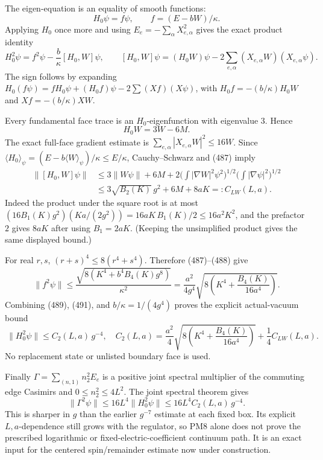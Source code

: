 \documentclass[
  11pt,
]{article}
\begin{document}
The eigen-equation is an equality of smooth functions: \[
 H_0\psi=f\psi,\qquad f=(E-bW)/\kappa. \tag{488}
\] Applying \(H_0\) once more and using
\(E_e=-\sum_\alpha X_{e,\alpha}^2\) gives the exact product identity \[
 H_0^2\psi=f^2\psi-\frac b\kappa[H_0,W]\psi,\qquad
 [H_0,W]\psi=(H_0W)\psi-2\sum_{e,\alpha}(X_{e,\alpha}W)(X_{e,\alpha}\psi).
 \tag{489}
\] The sign follows by expanding
\(H_0(f\psi)=fH_0\psi+(H_0f)\psi-2\sum(Xf)(X\psi)\), with
\(H_0f=-(b/\kappa)H_0W\) and \(Xf=-(b/\kappa)XW\).

Every fundamental face trace is an \(H_0\)-eigenfunction with eigenvalue
\(3\). Hence \[
 H_0W=3W-6M. \tag{490}
\] The exact full-face gradient estimate is
\(\sum_{e,\alpha}|X_{e,\alpha}W|^2\le16W\). Since
\(\langle H_0\rangle_\psi=(E-b\langle W\rangle_\psi)/\kappa\le E/\kappa\),
Cauchy--Schwarz and (487) imply \[
\begin{aligned}
\|[H_0,W]\psi\|
&\le3\|W\psi\|+6M
 +2\Big(\int|\nabla W|^2\psi^2\Big)^{1/2}
       \Big(\int|\nabla\psi|^2\Big)^{1/2}\\
&\le3\sqrt{B_2(K)}\,g^2+6M+8aK=:C_{LW}(L,a).
\end{aligned}\tag{491}
\] Indeed the product under the square root is at most
\((16B_1(K)g^2)(Ka/(2g^2))=16aK\,B_1(K)/2\le16a^2K^2\), and the
prefactor \(2\) gives \(8aK\) after using \(B_1=2aK\). (Keeping the
unsimplified product gives the same displayed bound.)

For real \(r,s\), \((r+s)^4\le8(r^4+s^4)\). Therefore (487)--(488) give
\[
\|f^2\psi\|
\le\frac{\sqrt{8(K^4+b^4B_4(K)g^8)}}{\kappa^2}
=\frac{a^2}{4g^4}
\sqrt{8\left(K^4+\frac{B_4(K)}{16a^4}\right)}.
\tag{492}
\] Combining (489), (491), and \(b/\kappa=1/(4g^4)\) proves the explicit
actual-vacuum bound \[
\boxed{\ \|H_0^2\psi\|\le C_2(L,a)\,g^{-4},\quad
C_2(L,a)=\frac{a^2}{4}\sqrt{8\left(K^4+\frac{B_4(K)}{16a^4}\right)}
+\frac14C_{LW}(L,a).\ }\tag{493}
\] No replacement state or unlisted boundary face is used.

Finally \(\Gamma=\sum_{(n,1)}n_2^2E_e\) is a positive joint spectral
multiplier of the commuting edge Casimirs and \(0\le n_2^2\le4L^2\). The
joint spectral theorem gives \[
\|\Gamma^2\psi\|\le16L^4\|H_0^2\psi\|
\le16L^4C_2(L,a)\,g^{-4}. \tag{494}
\] This is sharper in \(g\) than the earlier \(g^{-7}\) estimate at each
fixed box. Its explicit \(L,a\)-dependence still grows with the
regulator, so PM8 alone does not prove the prescribed logarithmic or
fixed-electric-coefficient continuum path. It is an exact input for the
centered spin/remainder estimate now under construction.
\end{document}
